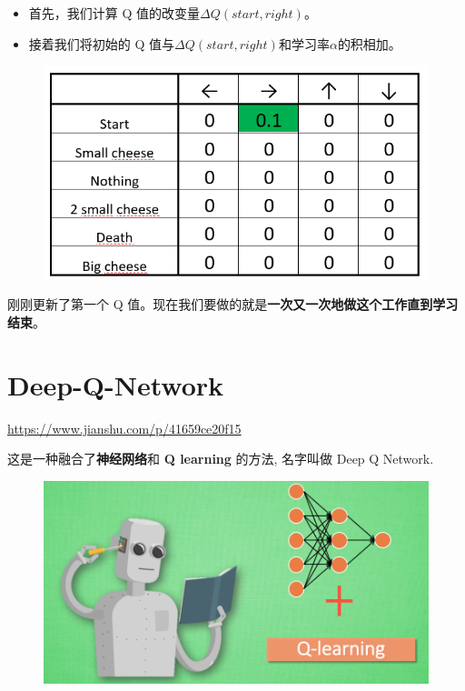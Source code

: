 \documentclass[UTF8,a4paper,12pt]{ctexbook}
\begin{document}
				\begin{itemize}
					\item 首先，我们计算 Q 值的改变量$\Delta Q(start, right)$。
					\item 接着我们将初始的 Q 值与$\Delta Q(start, right)$和学习率$\alpha$的积相加。
				\end{itemize}
				
				\begin{figure}[H]
					\centering
					\includegraphics[width=.7\linewidth]{qExample06}
				\end{figure}
				
				刚刚更新了第一个 Q 值。现在我们要做的就是\textbf{一次又一次地做这个工作直到学习结束}。		
		

	
	\section{Deep-Q-Network}
		\url{https://www.jianshu.com/p/41659ce20f15}
	
		这是一种融合了\textbf{神经网络}和 \textbf{Q learning} 的方法, 名字叫做 Deep Q Network.
			\begin{figure}[H]
				\centering
				\includegraphics[width=.9\linewidth]{DQN1}
			\end{figure}
			
\end{document}
